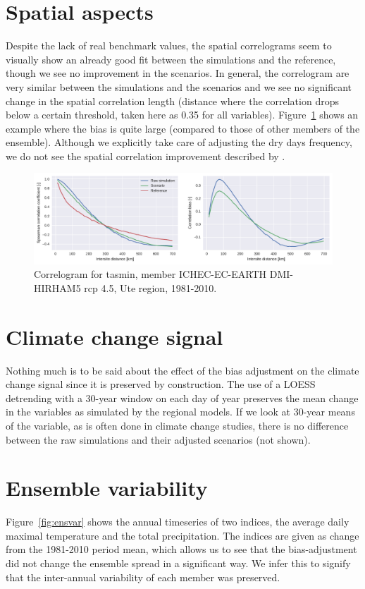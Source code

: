 \documentclass[letterpaper,10pt]{article}
\begin{document}
\section{Spatial aspects}
Despite the lack of real benchmark values, the spatial correlograms seem to visually show an already good fit between the simulations and the reference, though we see no improvement in the scenarios.
In general, the correlogram are very similar between the simulations and the scenarios and we see no significant change in the spatial correlation length (distance where the correlation drops below a certain threshold, taken here as 0.35 for all variables).
Figure~\ref{fig:scorr} shows an example where the bias is quite large (compared to those of other members of the ensemble).
Although we explicitly take care of adjusting the dry days frequency, we do not see the spatial correlation improvement described by \cite{Francois2020}.

\begin{figure}
\centering
\includegraphics[width=\textwidth]{../images/correlogram_tasmin_diags.pdf}
\caption{Correlogram for tasmin, member ICHEC-EC-EARTH DMI-HIRHAM5 rcp 4.5, Ute region, 1981-2010.}\label{fig:scorr}
\end{figure}

\section{Climate change signal}
Nothing much is to be said about the effect of the bias adjustment on the climate change signal since it is preserved by construction.
The use of a LOESS detrending with a 30-year window on each day of year preserves the mean change in the variables as simulated by the regional models.
If we look at 30-year means of the variable, as is often done in climate change studies, there is no difference between the raw simulations and their adjusted scenarios (not shown).

\section{Ensemble variability}
Figure~\ref{fig:ensvar} shows the annual timeseries of two indices, the average daily maximal temperature and the total precipitation.
The indices are given as change from the 1981-2010 period mean, which allows us to see that the bias-adjustment did not change the ensemble spread in a significant way.
We infer this to signify that the inter-annual variability of each member was preserved.
\end{document}
